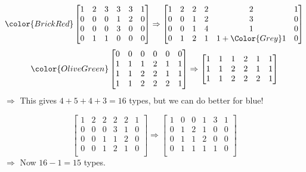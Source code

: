 \begin{frame}
	\begin{equation}
	\color{BrickRed}
    \begin{bmatrix}
         1&2&3&3&3&1\\
         0&0&0&1&2&0\\
         0&0&0&3&0&0\\
         0&1&1&0&0&0\\
    \end{bmatrix}\Rightarrow \begin{bmatrix}
	    1&2&2&2&2&1\\
         0&0&1&2&3&0\\
         0&0&1&4&1&0\\
	    0&1&2&1&1+\Color{Grey}1&0\\
    \end{bmatrix}
\end{equation}
\begin{equation}
\color{OliveGreen}
    \begin{bmatrix}
         0&0&0&0&0&0\\
         1&1&1&2&1&1\\
         1&1&2&2&1&1\\
         1&1&2&2&2&1\\
        
    \end{bmatrix}\Rightarrow \begin{bmatrix}
         1&1&1&2&1&1\\
         1&1&2&2&1&1\\
         1&1&2&2&2&1\\
        
    \end{bmatrix}
\end{equation}
$\Rightarrow$ This gives $4+5+4+3=16$ types, but we can do better for blue!
	\begin{frame}
	\begin{equation}

    \begin{bmatrix}
        1&2&2&2&2&1\\
        0&0&0&3&1&0\\
        0&0&1&1&2&0\\
        0&0&1&2&1&0\\
    \end{bmatrix} \Rightarrow \begin{bmatrix}
	    1& 0& 0& 1& 3& 1\\
	    0& 1& 2& 1& 0& 0\\
	    0& 1& 1& 2& 0& 0\\
	    0& 1& 1& 1& 1& 0 \\
    \end{bmatrix}
	\end{equation}
$\Rightarrow$ Now $16-1=15$ types.




\end{frame}
\end{frame}
